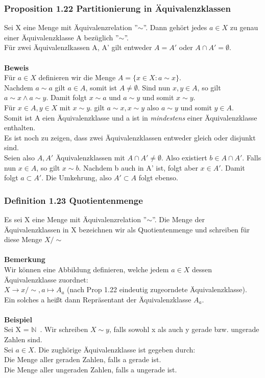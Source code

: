 \documentclass{report}
\newcommand{\mN}{$\mathbb{N}$\ }
\theoremstyle{customrem}
\theoremstyle{customdef}
\begin{document}
\subsubsection{Proposition 1.22 Partitionierung in Äquivalenzklassen}
Sei X eine Menge mit Äquivalenzrelation ''$\sim$''. Dann gehört jedes $a \in X$ zu genau einer Äquivalenzklasse A bezüglich ''$\sim$''.\\
Für zwei Äquivalenzlkassen A, A' gilt entweder $A = A'$ oder $A\cap A' = \emptyset$.\\
\\
\textbf{Beweis}\\
Für $a \in X$ definieren wir die Menge $A = \{x \in X : a \sim x\}$.\\
Nachdem $a \sim a$ gilt $a \in A$, somit ist $A \neq \emptyset$. Sind nun $x, y \in A$, so gilt $a \sim x \land a \sim y$. Damit folgt $x \sim a$ und $a \sim y$ und somit $x \sim y$.\\
Für $x \in A, y \in X$ mit $x \sim y$. gilt $a \sim x, x \sim y$ also $a \sim y$ und somit $y \in A$.\\
Somit ist A eien Äquivalenzklasse und a ist in \textit{mindestens} einer Äquivalenzklasse enthalten.\\
Es ist noch zu zeigen, dass zwei Äquivalenzklassen entweder gleich oder disjunkt sind.\\
Seien also $A, A'$ Äquivalenzklassen mit $A \cap A' \neq \emptyset$. Also existiert $b \in A\cap A'$. Falls nun $x \in A$, so gilt $x \sim b$. Nachdem b auch in A' ist, folgt aber $x \in A'$. Damit folgt $a \subset A'$. Die Umkehrung, also $A' \subset A$ folgt ebenso.

\subsubsection{Definition 1.23 Quotientenmenge}
Es sei X eine Menge mit Äquivalenzrelation ''$\sim$''. Die Menge der Äquivalenzklassen in X bezeichnen wir  als Quotientenmenge und schreiben
 für diese Menge $X/{\sim}$\\
 \\
 \textbf{Bemerkung}\\
 Wir können eine Abbildung definieren, welche jedem $a \in X$ dessen Äquivalenzklasse zuordnet:\\
 $X \to x/{\sim}, a \mapsto A_a$ (nach Prop 1.22 eindeutig zugeorndete Äquivalenzklasse).\\
 Ein solches a hei\ss{}t dann Repräsentant der Äquivalenzklasse $A_a$.\\
 \\
 \textbf{Beispiel}\\
 Sei X = \mN. Wir schreiben $X \sim y$, falls sowohl x als auch y gerade bzw. ungerade Zahlen sind.\\
 Sei $a \in X$. Die zughörige Äquivalenzklasse ist gegeben durch:\\
 Die Menge aller geraden Zahlen, falls a gerade ist.\\
 Die Menge aller ungeraden Zahlen, falls a ungerade ist.
\end{document}
